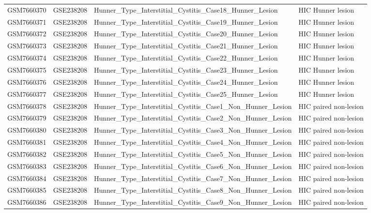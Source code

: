 \begin{longtable}{llp{}l}
GSM7660370 & GSE238208 & Hunner\_Type\_Interstitial\_Cystitis\_Case18\_Hunner\_Lesion & HIC Hunner lesion \\
GSM7660371 & GSE238208 & Hunner\_Type\_Interstitial\_Cystitis\_Case19\_Hunner\_Lesion & HIC Hunner lesion \\
GSM7660372 & GSE238208 & Hunner\_Type\_Interstitial\_Cystitis\_Case20\_Hunner\_Lesion & HIC Hunner lesion \\
GSM7660373 & GSE238208 & Hunner\_Type\_Interstitial\_Cystitis\_Case21\_Hunner\_Lesion & HIC Hunner lesion \\
GSM7660374 & GSE238208 & Hunner\_Type\_Interstitial\_Cystitis\_Case22\_Hunner\_Lesion & HIC Hunner lesion \\
GSM7660375 & GSE238208 & Hunner\_Type\_Interstitial\_Cystitis\_Case23\_Hunner\_Lesion & HIC Hunner lesion \\
GSM7660376 & GSE238208 & Hunner\_Type\_Interstitial\_Cystitis\_Case24\_Hunner\_Lesion & HIC Hunner lesion \\
GSM7660377 & GSE238208 & Hunner\_Type\_Interstitial\_Cystitis\_Case25\_Hunner\_Lesion & HIC Hunner lesion \\
GSM7660378 & GSE238208 & Hunner\_Type\_Interstitial\_Cystitis\_Case1\_Non\_Hunner\_Lesion & HIC paired non-lesion \\
GSM7660379 & GSE238208 & Hunner\_Type\_Interstitial\_Cystitis\_Case2\_Non\_Hunner\_Lesion & HIC paired non-lesion \\
GSM7660380 & GSE238208 & Hunner\_Type\_Interstitial\_Cystitis\_Case3\_Non\_Hunner\_Lesion & HIC paired non-lesion \\
GSM7660381 & GSE238208 & Hunner\_Type\_Interstitial\_Cystitis\_Case4\_Non\_Hunner\_Lesion & HIC paired non-lesion \\
GSM7660382 & GSE238208 & Hunner\_Type\_Interstitial\_Cystitis\_Case5\_Non\_Hunner\_Lesion & HIC paired non-lesion \\
GSM7660383 & GSE238208 & Hunner\_Type\_Interstitial\_Cystitis\_Case6\_Non\_Hunner\_Lesion & HIC paired non-lesion \\
GSM7660384 & GSE238208 & Hunner\_Type\_Interstitial\_Cystitis\_Case7\_Non\_Hunner\_Lesion & HIC paired non-lesion \\
GSM7660385 & GSE238208 & Hunner\_Type\_Interstitial\_Cystitis\_Case8\_Non\_Hunner\_Lesion & HIC paired non-lesion \\
GSM7660386 & GSE238208 & Hunner\_Type\_Interstitial\_Cystitis\_Case9\_Non\_Hunner\_Lesion & HIC paired non-lesion \\

\end{longtable}
